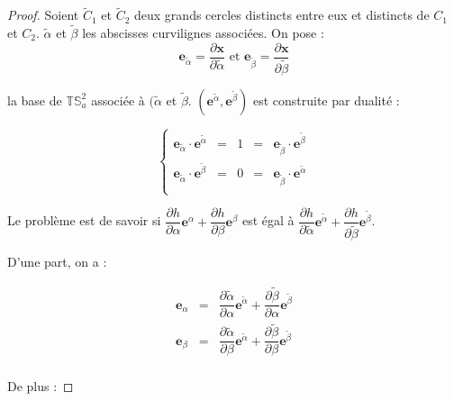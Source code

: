 \begin{proof}
Soient $\tilde{C}_1$ et $\tilde{C}_2$ deux grands cercles distincts entre eux et distincts de $C_1$ et $C_2$. $\tilde{\alpha}$ et $\tilde{\beta}$ les abscisses curvilignes associées. On pose :
\begin{equation}
\mathbf{e}_{\tilde{\alpha}} = \dfrac{\partial \mathbf{x}}{\partial \tilde{\alpha}} \text{ et } \mathbf{e}_{\tilde{\beta}} = \dfrac{\partial \mathbf{x}}{\partial \tilde{\beta}}
\end{equation}

la base de $\mathbb{T}\mathbb{S}_a^2$ associée à $(\tilde{\alpha}$ et $\tilde{\beta}$. $\left( \mathbf{e}^{\tilde{\alpha}}, \mathbf{e}^{\tilde{\beta}} \right)$ est construite par dualité :

\begin{equation}
\left\lbrace
\begin{array}{rcccl}
\mathbf{e}_{\tilde{\alpha}} \cdot \mathbf{e}^{\tilde{\alpha}} & = & 1 & = & \mathbf{e}_{\tilde{\beta}} \cdot \mathbf{e}^{\tilde{\beta}} \\
\mathbf{e}_{\tilde{\alpha}} \cdot \mathbf{e}^{\tilde{\beta}} & = & 0 & = & \mathbf{e}_{\tilde{\beta}} \cdot \mathbf{e}^{\tilde{\alpha}} \\
\end{array}
\right.
\end{equation}

Le problème est de savoir si $\dfrac{\partial h}{\partial \alpha} \mathbf{e}^{\alpha} + \dfrac{\partial h}{\partial \beta} \mathbf{e}^{\beta}$ est égal à $\dfrac{\partial h}{\partial \tilde{\alpha}} \mathbf{e}^{\tilde{\alpha}} + \dfrac{\partial h}{\partial \tilde{\beta}} \mathbf{e}^{\tilde{\beta}}$.

D'une part, on a :

\begin{equation}
\begin{array}{rcl}
\mathbf{e}_{\alpha} & = & \dfrac{\partial \tilde{\alpha}}{\partial \alpha} \mathbf{e}^{\tilde{\alpha}} + \dfrac{\partial \tilde{\beta}}{\partial \alpha} \mathbf{e}^{\tilde{\beta}} \\
\mathbf{e}_{\beta} & = & \dfrac{\partial \tilde{\alpha}}{\partial \beta} \mathbf{e}^{\tilde{\alpha}} + \dfrac{\partial \tilde{\beta}}{\partial \beta} \mathbf{e}^{\tilde{\beta}} \\
\end{array}
\end{equation}

De plus :


\end{proof}
